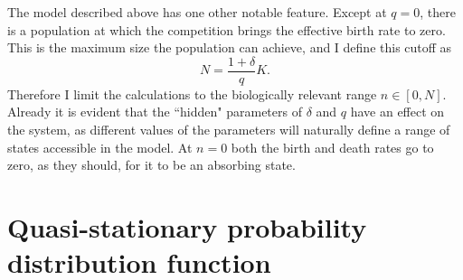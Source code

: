 The model described above has one other notable feature. 
Except at $q=0$, there is a population at which the competition brings the effective birth rate to zero. 
This is the maximum size the population can achieve, and I define this cutoff as
\begin{equation}
N = \frac{1+\delta}{q}K. 
\label{maxN}
\end{equation}
Therefore I limit the calculations to the biologically relevant range $n\in[0,N]$. %
Already it is evident that the ``hidden" parameters of $\delta$ and $q$ have an effect on the system, as different values of the parameters will naturally define a range of states accessible in the model. 
At $n=0$ both the birth and death rates go to zero, as they should, for it to be an absorbing state. %


\section{Quasi-stationary probability distribution function}%

